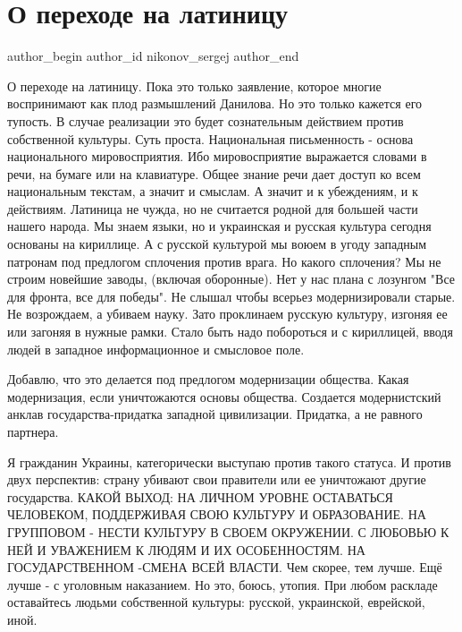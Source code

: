  
 
 
 
 
 
\section{О переходе на латиницу}
\label{sec:14_09_2021.fb.nikonov_sergej.1.latinica_danilov}
 
\ifcmt
 author_begin
   author_id nikonov_sergej
 author_end
\fi

О переходе на латиницу. Пока это только заявление, которое многие воспринимают
как плод размышлений Данилова. Но это только кажется его тупость. В случае
реализации это будет сознательным действием против собственной культуры. Суть
проста. Национальная письменность - основа национального мировосприятия. Ибо
мировосприятие выражается словами в речи, на бумаге или на клавиатуре. Общее
знание речи дает доступ ко всем национальным текстам, а значит и смыслам. А
значит и к убеждениям, и к действиям. Латиница не чужда, но не считается родной
для большей части нашего народа. Мы знаем языки, но и украинская и русская
культура сегодня основаны на кириллице. А с русской культурой мы воюем в угоду
западным патронам под предлогом сплочения против врага. Но какого сплочения? Мы
не строим новейшие заводы, (включая оборонные). Нет у нас плана с лозунгом "Все
для фронта, все для победы". Не слышал чтобы всерьез модернизировали старые. Не
возрождаем, а убиваем науку. Зато проклинаем русскую культуру, изгоняя ее или
загоняя в нужные рамки. Стало быть надо побороться и с кириллицей, вводя людей
в западное информационное и смысловое поле. 

Добавлю, что это делается под предлогом модернизации общества. Какая
модернизация, если уничтожаются основы общества. Создается модернистский анклав
государства-придатка западной цивилизации. Придатка, а не равного партнера. 

Я гражданин Украины, категорически выступаю против такого статуса. И против
двух перспектив: страну убивают свои правители или ее уничтожают другие
государства. КАКОЙ ВЫХОД: НА ЛИЧНОМ УРОВНЕ  ОСТАВАТЬСЯ ЧЕЛОВЕКОМ, ПОДДЕРЖИВАЯ
СВОЮ КУЛЬТУРУ И ОБРАЗОВАНИЕ. НА ГРУППОВОМ - НЕСТИ КУЛЬТУРУ В СВОЕМ ОКРУЖЕНИИ. С
ЛЮБОВЬЮ К НЕЙ И УВАЖЕНИЕМ К ЛЮДЯМ И ИХ ОСОБЕННОСТЯМ. НА ГОСУДАРСТВЕННОМ -СМЕНА
ВСЕЙ ВЛАСТИ. Чем скорее, тем лучше. Ещё лучше - с уголовным наказанием. Но это,
боюсь, утопия. При любом раскладе оставайтесь людьми собственной культуры:
русской, украинской, еврейской, иной.

